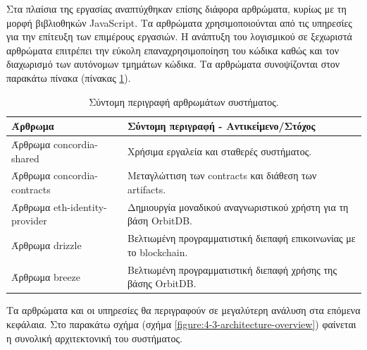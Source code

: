 Στα πλαίσια της εργασίας αναπτύχθηκαν επίσης διάφορα αρθρώματα, κυρίως με τη μορφή βιβλιοθηκών JavaScript. Τα αρθρώματα χρησιμοποιούνται από τις υπηρεσίες για την επίτευξη των επιμέρους εργασιών. Η ανάπτυξη του λογισμικού σε ξεχωριστά αρθρώματα επιτρέπει την εύκολη επαναχρησιμοποίηση του κώδικα καθώς και τον διαχωρισμό των αυτόνομων τμημάτων κώδικα. Τα αρθρώματα συνοψίζονται στον παρακάτω πίνακα (πίνακας \ref{table:4-3-software-units-summary}).

\begin{table}[H]
    \begin{center}
        \begin{tabularx}{\textwidth}{l X}
            \toprule
            \textbf{Άρθρωμα} & \textbf{Σύντομη περιγραφή - Αντικείμενο/Στόχος} \\
            \midrule
            Άρθρωμα concordia-shared      & Χρήσιμα εργαλεία και σταθερές συστήματος. \\ [0.5ex]
            Άρθρωμα concordia-contracts   & Μεταγλώττιση των contracts και διάθεση των artifacts. \\ [0.5ex]
            Άρθρωμα eth-identity-provider & Δημιουργία μοναδικού αναγνωριστικού χρήστη για τη βάση OrbitDB. \\ [0.5ex]
            Άρθρωμα drizzle               & Βελτιωμένη προγραμματιστική διεπαφή επικοινωνίας με το blockchain. \\ [0.5ex]
            Άρθρωμα breeze                & Βελτιωμένη προγραμματιστική διεπαφή χρήσης της βάσης OrbitDB. \\ [0.5ex]
            \bottomrule
        \end{tabularx}
    \end{center}
    \caption{Σύντομη περιγραφή αρθρωμάτων συστήματος.}
    \label{table:4-3-software-units-summary}
\end{table}

Τα αρθρώματα και οι υπηρεσίες θα περιγραφούν σε μεγαλύτερη ανάλυση στα επόμενα κεφάλαια. Στο παρακάτω σχήμα (σχήμα \ref{figure:4-3-architecture-overview}) φαίνεται η συνολική αρχιτεκτονική του συστήματος.

